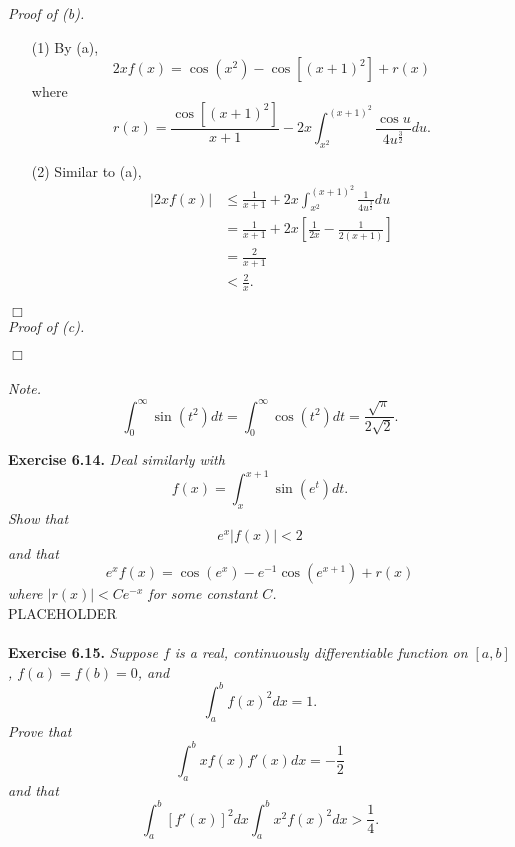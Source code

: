 \documentclass{article}
\begin{document}
\emph{Proof of (b).}
\begin{enumerate}
  \item[(1)]
  By (a),
  \[
    2xf(x) = \cos(x^2) - \cos[(x+1)^2] + r(x)
  \]
  where
  \[
    r(x)
    = \frac{\cos[(x+1)^2]}{x+1}
    - 2x\int_{x^2}^{(x+1)^2} \frac{\cos u}{4u^{\frac{3}{2}}} du.
  \]

  \item[(2)]
  Similar to (a),
  \begin{align*}
    |2xf(x)|
    &\leq \frac{1}{x+1}
      + 2x \int_{x^2}^{(x+1)^2} \frac{1}{4u^{\frac{3}{2}}} du \\
    &= \frac{1}{x+1}
      + 2x \left[ \frac{1}{2x} - \frac{1}{2(x+1)} \right] \\
    &= \frac{2}{x+1} \\
    &< \frac{2}{x}.
  \end{align*}
\end{enumerate}
$\Box$ \\



\emph{Proof of (c).}

$\Box$ \\\\


\emph{Note.}
\[
  \int_{0}^{\infty} \sin(t^2)dt
  = \int_{0}^{\infty} \cos(t^2)dt
  = \frac{\sqrt{\pi}}{2\sqrt{2}}.
\]






\textbf{Exercise 6.14.}
\emph{Deal similarly with
\[
  f(x) = \int_{x}^{x+1} \sin(e^t) dt.
\]
Show that
\[
  e^x|f(x)| < 2
\]
and that
\[
  e^x f(x) = \cos(e^x) - e^{-1} \cos(e^{x+1}) + r(x)
\]
where $|r(x)| < Ce^{-x}$ for some constant $C$.} \\

PLACEHOLDER \\\\






\textbf{Exercise 6.15.}
\emph{Suppose $f$ is a real, continuously differentiable function on $[a,b]$,
$f(a)=f(b)=0$, and
\[
  \int_{a}^{b} f(x)^2 dx = 1.
\]
Prove that
\[
  \int_{a}^{b} xf(x)f'(x) dx = -\frac{1}{2}
\]
and that
\[
  \int_{a}^{b} [f'(x)]^2 dx \int_{a}^{b} x^2f(x)^2 dx > \frac{1}{4}.
\]
} \\
\end{document}
